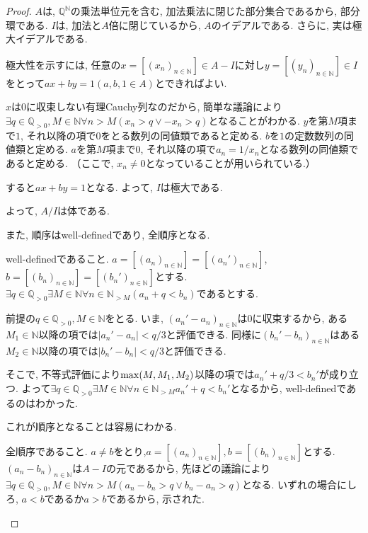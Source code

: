 \documentclass[a4paper, twoside]{bxjsarticle}
\newcommand{\nat}{\mathbb{N}}
\newcommand{\quo}{\mathbb{Q}}
\newcommand{\abs}[1]{\left\lvert#1\right\rvert}
\theoremstyle{definition}
\begin{document}
        \begin{proof}
            $A$は, $\quo^\nat$の乗法単位元を含む, 加法乗法に閉じた部分集合であるから, 部分環である. $I$は, 加法と$A$倍に閉じているから, $A$のイデアルである. さらに, 実は極大イデアルである.
            \begin{framed}
                極大性を示すには, 任意の$x=[(x_n)_{n\in\nat}]\in A-I$に対し$y=[(y_n)_{n\in\nat}]\in I$をとって$ax+by=1 (a, b, 1\in A)$とできればよい.
                
                $x$は0に収束しない有理Cauchy列なのだから, 簡単な議論により$\exists q\in\quo_{>0}, M\in\nat \forall n>M (x_n>q \lor -x_n>q)$となることがわかる. $y$を第$M$項まで$1$, それ以降の項で$0$をとる数列の同値類であると定める. $b$を$1$の定数数列の同値類と定める. $a$を第$M$項まで$0$, それ以降の項で$a_n=1/x_n$となる数列の同値類であると定める. （ここで, $x_n\neq 0$となっていることが用いられている.）
                
                すると$ax+by=1$となる. よって, $I$は極大である.
            \end{framed}
            よって, $A/I$は体である.
            
            また, 順序はwell-definedであり, 全順序となる.
            \begin{framed}
                well-definedであること. $a=[(a_n)_{n\in\nat}]=[(a_n')_{n\in\nat}]$, $b=[(b_n)_{n\in\nat}]=[(b_n')_{n\in\nat}]$とする. $\exists q\in\quo_{>0}\exists M\in\nat \forall n\in\nat_{>M} (a_n+q<b_n)$であるとする.
                
                前提の$q\in\quo_{>0}, M\in\nat$をとる. いま, $(a_n'-a_n)_{n\in\nat}$は0に収束するから, ある$M_1\in\nat$以降の項では$\abs{a_n'-a_n}<q/3$と評価できる. 同様に$(b_n'-b_n)_{n\in\nat}$はある$M_2\in\nat$以降の項では$\abs{b_n'-b_n}<q/3$と評価できる.
                
                そこで, 不等式評価により${\rm max}(M, M_1, M_2)$以降の項では$a_n'+q/3<b_n'$が成り立つ. よって$\exists q\in\quo_{>0}\exists M\in\nat \forall n\in\nat_{>M} a_n'+q<b_n'$となるから, well-definedであるのはわかった.
                
                これが順序となることは容易にわかる.
                
                全順序であること. $a\neq b$をとり,$a=[(a_n)_{n\in\nat}], b=[(b_n)_{n\in\nat}]$とする. $(a_n-b_n)_{n\in\nat}$は$A-I$の元であるから, 先ほどの議論により$\exists q\in\quo_{>0}, M\in\nat \forall n>M (a_n-b_n>q \lor b_n-a_n>q)$となる. いずれの場合にしろ, $a<b$であるか$a>b$であるから, 示された. 
            \end{framed}
            

\end{proof}
\end{document}
